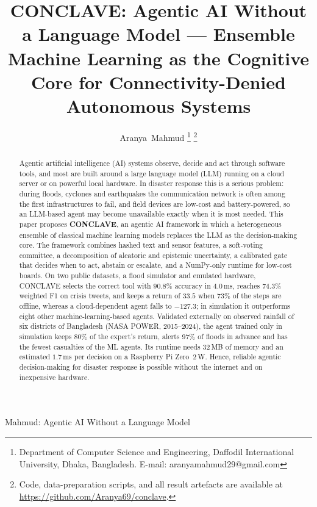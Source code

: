 \documentclass[journal]{IEEEtran}
\begin{document}
\title{CONCLAVE: Agentic AI Without a Language Model ---
Ensemble Machine Learning as the Cognitive Core for
Connectivity-Denied Autonomous Systems}

\author{Aranya~Mahmud%
\thanks{Department of Computer Science and Engineering, Daffodil International
University, Dhaka, Bangladesh. E-mail: aranyamahmud29@gmail.com}%
\thanks{Code, data-preparation scripts, and all result artefacts are available at
\url{https://github.com/Aranya69/conclave}.}}

%
{Mahmud: Agentic AI Without a Language Model}

\maketitle

\begin{abstract}
Agentic artificial intelligence (AI) systems observe, decide and act through
software tools, and most are built around a large language model (LLM) running
on a cloud server or on powerful local hardware. In disaster response this is a serious problem: during floods,
cyclones and earthquakes the communication network is often among the first
infrastructures to fail, and field devices are low-cost and battery-powered, so an LLM-based agent may become unavailable exactly when it
is most needed. This paper proposes
\textbf{CONCLAVE}, an agentic AI framework in which a heterogeneous ensemble of
classical machine learning models replaces the LLM as the decision-making core.
The framework combines hashed text and sensor features, a soft-voting
committee, a decomposition of aleatoric and epistemic uncertainty, a calibrated
gate that decides when to act, abstain or escalate, and a
NumPy-only runtime for low-cost boards. On two public datasets, a flood simulator and emulated hardware, CONCLAVE
selects the correct tool with $90.8\%$ accuracy in $4.0$\,ms, reaches
$74.3\%$ weighted F1 on crisis tweets, and keeps a return of $33.5$ when
$73\%$ of the steps are offline, whereas a cloud-dependent agent falls to
$-127.3$; in simulation it outperforms eight other machine-learning-based
agents. Validated externally on observed rainfall of six districts of Bangladesh
(NASA POWER, 2015--2024), the agent trained only in simulation keeps $80\%$ of
the expert's return, alerts $97\%$ of floods in advance and has the fewest
casualties of the ML agents. Its runtime needs
$32$\,MB of memory and an estimated $1.7$\,ms per decision on a Raspberry Pi
Zero~2\,W.
Hence, reliable agentic decision-making for disaster response is possible
without the internet and on inexpensive hardware.
\end{abstract}
\end{document}
